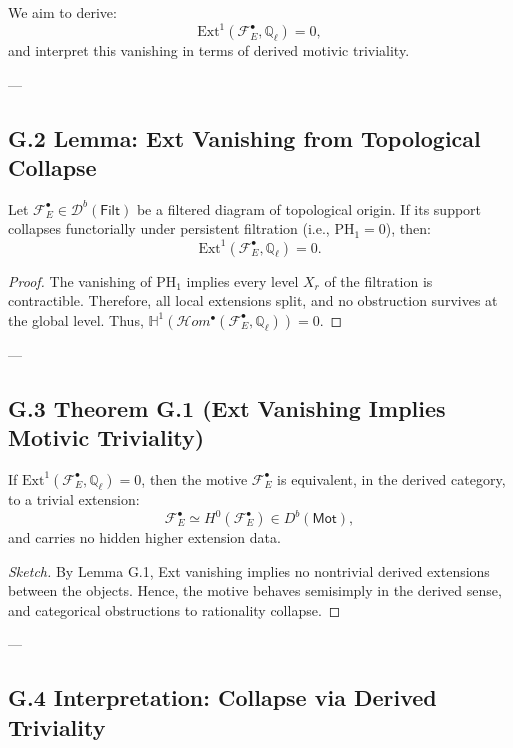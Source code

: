 We aim to derive:
\[
\mathrm{Ext}^1(\mathcal{F}_E^\bullet, \mathbb{Q}_\ell) = 0,
\]
and interpret this vanishing in terms of derived motivic triviality.

---

\subsection*{G.2 Lemma: Ext Vanishing from Topological Collapse}

\begin{lemma}
Let \( \mathcal{F}_E^\bullet \in \mathcal{D}^b(\mathsf{Filt}) \) be a filtered diagram of topological origin.  
If its support collapses functorially under persistent filtration (i.e., \( \mathrm{PH}_1 = 0 \)), then:
\[
\mathrm{Ext}^1(\mathcal{F}_E^\bullet, \mathbb{Q}_\ell) = 0.
\]
\end{lemma}

\begin{proof}
The vanishing of \( \mathrm{PH}_1 \) implies every level \( X_r \) of the filtration is contractible.  
Therefore, all local extensions split, and no obstruction survives at the global level.  
Thus, \( \mathbb{H}^1(\mathcal{H}om^\bullet(\mathcal{F}_E^\bullet, \mathbb{Q}_\ell)) = 0 \).
\end{proof}

---

\subsection*{G.3 Theorem G.1 (Ext Vanishing Implies Motivic Triviality)}

\begin{theorem}
If \( \mathrm{Ext}^1(\mathcal{F}_E^\bullet, \mathbb{Q}_\ell) = 0 \), then the motive \( \mathcal{F}_E^\bullet \) is equivalent, in the derived category,  
to a trivial extension:
\[
\mathcal{F}_E^\bullet \simeq H^0(\mathcal{F}_E^\bullet) \in D^b(\mathsf{Mot}),
\]
and carries no hidden higher extension data.
\end{theorem}

\begin{proof}[Sketch]
By Lemma G.1, Ext vanishing implies no nontrivial derived extensions between the objects.  
Hence, the motive behaves semisimply in the derived sense,  
and categorical obstructions to rationality collapse.
\end{proof}

---

\subsection*{G.4 Interpretation: Collapse via Derived Triviality}

